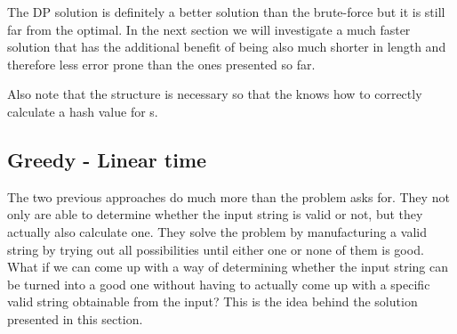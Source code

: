The DP solution is definitely a better solution than the brute-force but it is still far from the optimal. In the next section we will investigate a much faster solution that has the additional benefit of being also much shorter in length and therefore less error prone than the ones presented so far.



Also note that the structure  is necessary so that the  knows how to  correctly calculate a hash value for  s. 

\subsection{Greedy - Linear time}
\label{valid_parenthesis:sec:linear}
The two previous approaches do much more than the problem asks for. They not only are able to determine whether the input string is valid or not, but they actually also calculate one. They solve the problem by manufacturing a valid string by trying out all possibilities until either one or none of them is good. What if we can come up with a way of determining whether the input string can be turned into a good one without having to actually come up with a specific valid string obtainable from the input? This is the idea behind the solution presented in this section.

